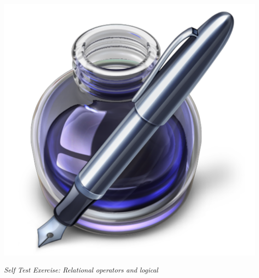 \addtolength{\parindent}{-4mm}
\begin{minipage}{\linewidth}
\begin{minipage}{6mm}
\includegraphics[scale=0.035]{Graphics/General/exercise_icon}
\end{minipage}
\textit{Self Test Exercise: Relational operators and logical}
\end{minipage}
\addtolength{\parindent}{4mm}
